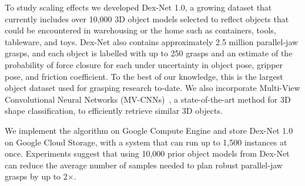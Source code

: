 To study scaling effects we developed Dex-Net 1.0, a growing dataset that currently includes over 10,000 3D object models selected to reflect objects that could be encountered in warehousing or the home such as containers, tools, tableware, and toys.
Dex-Net also contains approximately 2.5 million parallel-jaw grasps, and each object is labelled with up to 250 grasps and an estimate of the probability of force closure for each under uncertainty in object pose, gripper pose, and friction coefficient.
To the best of our knowledge, this is the largest object dataset used for grasping research to-date.
We also incorporate Multi-View Convolutional Neural Networks (MV-CNNs)~\cite{su2015multi}, a state-of-the-art method for 3D shape classification, to efficiently retrieve similar 3D objects. 

We implement the algorithm on Google Compute Engine and store Dex-Net 1.0 on Google Cloud Storage, with a system that can run up to 1,500 instances at once.
Experiments suggest that using 10,000 prior object models from Dex-Net can reduce the average number of samples needed to plan robust parallel-jaw grasps by up to 2$\times$.

 





